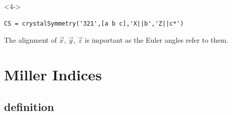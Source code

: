 \documentclass[compress]{beamer}
\begin{document}
\begin{frame}[fragile]
\begin{overlayarea}{\textwidth}{8cm}
\begin{onlyenv}<4->
  \begin{lstlisting}[style=input]
CS = crystalSymmetry('321',[a b c],'X||b','Z||c*')
\end{lstlisting}
\alert{The alignment of $\vec x$, $\vec y$, $\vec z$ is important as the Euler angles
refer to them.}
\end{onlyenv}

\end{overlayarea}

\end{frame}

\section{Miller Indices}
\label{sec:miller-indices}

\subsection*{definition}
\label{sec:definition}
\end{document}
